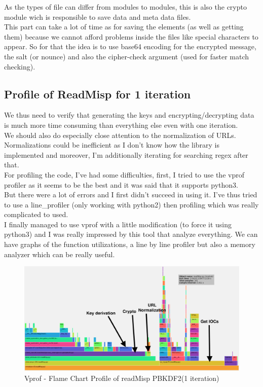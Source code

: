 \documentclass{eplmastersthesis}
\begin{document}
As the types of file can differ from modules to modules, this is also the crypto module wich is responsible to save data and meta data files.\\
This part can take a lot of time as for saving the elements (as well as getting them) because we cannot afford problems inside the files like special characters to appear. So for that the idea is to use base64 encoding for the encrypted message, the salt (or nounce) and also the cipher-check argument (used for faster match checking).\\


\subsection{Profile of ReadMisp for 1 iteration}
We thus need to verify that generating the keys and encrypting/decrypting data is much more time consuming than everything else even with one iteration.\\
We should also do especially close attention to the normalization of URLs. Normalizations could be inefficient as I don't know how the library is implemented and moreover, I'm additionally iterating for searching regex after that.\\

For profiling the code, I've had some difficulties, first, I tried to use the vprof profiler as it seems to be the best and it was said that it supports python3.\\
But there were a lot of errors and I first didn't succeed in using it. I've thus tried to use a line\_profiler (only working with python2) then profiling which was really complicated to used. \\
I finally managed to use vprof with a little modification (to force it using python3) and I was really impressed by this tool that analyze everything. We can have graphs of the function utilizations, a line by line profiler but also a memory analyzer which can be really useful.\\

\begin{figure}[h!]
\begin{center}
	\includegraphics[scale=0.3]{res/profile-1iter}
	\caption{Vprof - Flame Chart Profile of readMisp PBKDF2(1 iteration)}
	\label{profile-readMisp}
\end{center}
\end{figure}
\end{document}
